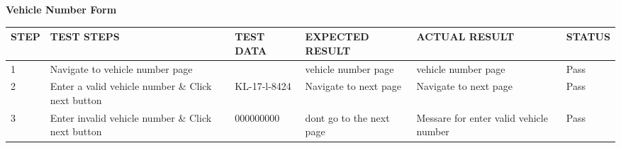 \centering \textbf{Vehicle Number Form} 
\vspace{0.5cm}
\begin{center}
 
\renewcommand{\arraystretch}{2}

\begin{tabular}{|p{1cm}|p{3cm}|p{3cm}|p{3cm}|p{3cm}|p{2cm}|}

\hline \textbf{STEP} & \textbf{TEST STEPS} & \textbf{TEST DATA} &\textbf{EXPECTED RESULT} & \textbf{ACTUAL RESULT} & \textbf{STATUS}  \\
\hline
1&  Navigate to vehicle number page & & vehicle number page & vehicle number page & Pass\\
\hline
2& Enter a valid vehicle number \& Click next button &KL-17-l-8424 & Navigate to next page & Navigate to next page &Pass\\
\hline
3&Enter invalid vehicle number \& Click next button & 000000000 & dont go to the next page &Messare for enter valid vehicle number & Pass\\
\hline

\end{tabular}
\end{center}

